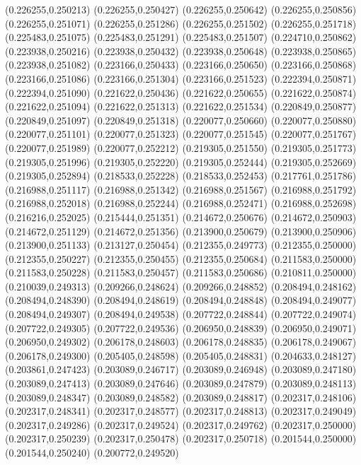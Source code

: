 (0.226255,0.250213)
(0.226255,0.250427)
(0.226255,0.250642)
(0.226255,0.250856)
(0.226255,0.251071)
(0.226255,0.251286)
(0.226255,0.251502)
(0.226255,0.251718)
(0.225483,0.251075)
(0.225483,0.251291)
(0.225483,0.251507)
(0.224710,0.250862)
(0.223938,0.250216)
(0.223938,0.250432)
(0.223938,0.250648)
(0.223938,0.250865)
(0.223938,0.251082)
(0.223166,0.250433)
(0.223166,0.250650)
(0.223166,0.250868)
(0.223166,0.251086)
(0.223166,0.251304)
(0.223166,0.251523)
(0.222394,0.250871)
(0.222394,0.251090)
(0.221622,0.250436)
(0.221622,0.250655)
(0.221622,0.250874)
(0.221622,0.251094)
(0.221622,0.251313)
(0.221622,0.251534)
(0.220849,0.250877)
(0.220849,0.251097)
(0.220849,0.251318)
(0.220077,0.250660)
(0.220077,0.250880)
(0.220077,0.251101)
(0.220077,0.251323)
(0.220077,0.251545)
(0.220077,0.251767)
(0.220077,0.251989)
(0.220077,0.252212)
(0.219305,0.251550)
(0.219305,0.251773)
(0.219305,0.251996)
(0.219305,0.252220)
(0.219305,0.252444)
(0.219305,0.252669)
(0.219305,0.252894)
(0.218533,0.252228)
(0.218533,0.252453)
(0.217761,0.251786)
(0.216988,0.251117)
(0.216988,0.251342)
(0.216988,0.251567)
(0.216988,0.251792)
(0.216988,0.252018)
(0.216988,0.252244)
(0.216988,0.252471)
(0.216988,0.252698)
(0.216216,0.252025)
(0.215444,0.251351)
(0.214672,0.250676)
(0.214672,0.250903)
(0.214672,0.251129)
(0.214672,0.251356)
(0.213900,0.250679)
(0.213900,0.250906)
(0.213900,0.251133)
(0.213127,0.250454)
(0.212355,0.249773)
(0.212355,0.250000)
(0.212355,0.250227)
(0.212355,0.250455)
(0.212355,0.250684)
(0.211583,0.250000)
(0.211583,0.250228)
(0.211583,0.250457)
(0.211583,0.250686)
(0.210811,0.250000)
(0.210039,0.249313)
(0.209266,0.248624)
(0.209266,0.248852)
(0.208494,0.248162)
(0.208494,0.248390)
(0.208494,0.248619)
(0.208494,0.248848)
(0.208494,0.249077)
(0.208494,0.249307)
(0.208494,0.249538)
(0.207722,0.248844)
(0.207722,0.249074)
(0.207722,0.249305)
(0.207722,0.249536)
(0.206950,0.248839)
(0.206950,0.249071)
(0.206950,0.249302)
(0.206178,0.248603)
(0.206178,0.248835)
(0.206178,0.249067)
(0.206178,0.249300)
(0.205405,0.248598)
(0.205405,0.248831)
(0.204633,0.248127)
(0.203861,0.247423)
(0.203089,0.246717)
(0.203089,0.246948)
(0.203089,0.247180)
(0.203089,0.247413)
(0.203089,0.247646)
(0.203089,0.247879)
(0.203089,0.248113)
(0.203089,0.248347)
(0.203089,0.248582)
(0.203089,0.248817)
(0.202317,0.248106)
(0.202317,0.248341)
(0.202317,0.248577)
(0.202317,0.248813)
(0.202317,0.249049)
(0.202317,0.249286)
(0.202317,0.249524)
(0.202317,0.249762)
(0.202317,0.250000)
(0.202317,0.250239)
(0.202317,0.250478)
(0.202317,0.250718)
(0.201544,0.250000)
(0.201544,0.250240)
(0.200772,0.249520)
